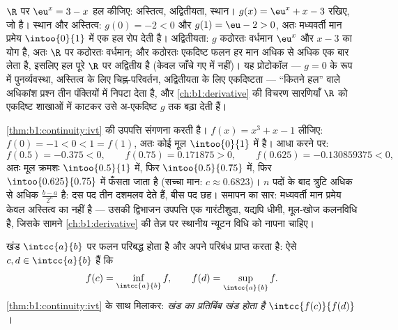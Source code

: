 \begin{example}[एक समीकरण, पूरा प्रोटोकॉल]\label{ex:b1:continuity:protocol}
$\R$ पर $\eu^x = 3 - x$ हल कीजिए: अस्तित्व, अद्वितीयता, स्थान। $g(x) = \eu^x
+ x - 3$ रखिए, जो  है। स्थान और अस्तित्व: $g(0) = -2 < 0$ और $g(1) = \eu
- 2 > 0$, अतः मध्यवर्ती मान प्रमेय $\intoo{0}{1}$ में एक हल रोप देती है।
अद्वितीयता: $g$ कठोरतः वर्धमान $\eu^x$ और $x - 3$ का योग है, अतः $\R$ पर
कठोरतः वर्धमान; और कठोरतः एकदिष्ट फलन हर मान अधिक से अधिक एक बार लेता है,
इसलिए हल पूरे $\R$ पर अद्वितीय है (केवल जाँचे गए  में नहीं)। यह
प्रोटोकॉल --- $g = 0$ के रूप में पुनर्व्यवस्था, अस्तित्व के लिए
चिह्न-परिवर्तन, अद्वितीयता के लिए एकदिष्टता --- ``कितने हल'' वाले अधिकांश
प्रश्न तीन पंक्तियों में निपटा देता है, और \cref{ch:b1:derivative} की विचरण
सारणियाँ $\R$ को एकदिष्ट शाखाओं में काटकर उसे अ-एकदिष्ट $g$ तक बढ़ा देती
हैं।
\end{example}

\begin{example}[कलनविधि के रूप में द्विभाजन]\label{ex:b1:continuity:dichotomy}
\cref{thm:b1:continuity:ivt} की उपपत्ति संगणना करती है। $f(x) = x^3 + x - 1$
लीजिए: $f(0) = -1 < 0 < 1 = f(1)$, अतः कोई मूल $\intoo{0}{1}$ में है। आधा
करने पर:
\[
f(0.5) = -0.375 < 0, \qquad
f(0.75) = 0.171875 > 0, \qquad
f(0.625) = -0.130859375 < 0 ,
\]
अतः मूल क्रमशः $\intoo{0.5}{1}$ में, फिर $\intoo{0.5}{0.75}$ में, फिर
$\intoo{0.625}{0.75}$ में फँसता जाता है (सच्चा मान: $c \approx 0.6823$)। $n$
पदों के बाद त्रुटि अधिक से अधिक $\frac{b - a}{2^n}$ है: दस पद तीन दशमलव देते
हैं, बीस पद छह। समापन का सार: मध्यवर्ती मान प्रमेय केवल अस्तित्व का  नहीं
है --- उसकी द्विभाजन उपपत्ति एक गारंटीशुदा, यद्यपि धीमी, मूल-खोज कलनविधि है,
जिसके सामने \cref{ch:b1:derivative} की तेज़ पर स्थानीय न्यूटन विधि को नापना
चाहिए।
\end{example}

\begin{theorem}[चरम मान प्रमेय]\label{thm:b1:continuity:evt}
खंड $\intcc{a}{b}$ पर  फलन परिबद्ध होता है और अपने परिबंध प्राप्त करता
है: ऐसे $c, d \in \intcc{a}{b}$ हैं कि
\[
f(c) = \inf_{\intcc{a}{b}} f,
\qquad
f(d) = \sup_{\intcc{a}{b}} f .
\]
\cref{thm:b1:continuity:ivt} के साथ मिलाकर: \emph{खंड का  प्रतिबिंब खंड
होता है} $\intcc{f(c)}{f(d)}$। 
\end{theorem}

